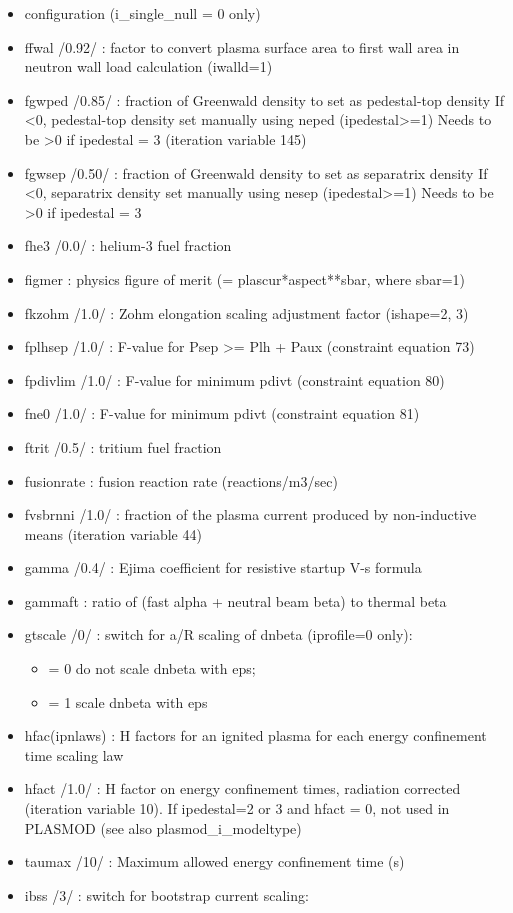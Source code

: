 \documentclass[]{article}
\providecommand{\tightlist}{%
  \setlength{\itemsep}{0pt}\setlength{\parskip}{0pt}}
\begin{document}
\begin{itemize}
\item
  configuration (i_single_null = 0 only)
\item
  ffwal /0.92/ : factor to convert plasma surface area to first wall
  area in neutron wall load calculation (iwalld=1)
\item
  fgwped /0.85/ : fraction of Greenwald density to set as pedestal-top
  density If \textless{}0, pedestal-top density set manually using neped
  (ipedestal\textgreater{}=1) Needs to be \textgreater{}0 if ipedestal =
  3 (iteration variable 145)
\item
  fgwsep /0.50/ : fraction of Greenwald density to set as separatrix
  density If \textless{}0, separatrix density set manually using nesep
  (ipedestal\textgreater{}=1) Needs to be \textgreater{}0 if ipedestal =
  3
\item
  fhe3 /0.0/ : helium-3 fuel fraction
\item
  figmer : physics figure of merit (= plascur*aspect**sbar, where
  sbar=1)
\item
  fkzohm /1.0/ : Zohm elongation scaling adjustment factor (ishape=2, 3)
\item
  fplhsep /1.0/ : F-value for Psep \textgreater{}= Plh + Paux
  (constraint equation 73)
\item
  fpdivlim /1.0/ : F-value for minimum pdivt (constraint equation 80)
\item
  fne0 /1.0/ : F-value for minimum pdivt (constraint equation 81)
\item
  ftrit /0.5/ : tritium fuel fraction
\item
  fusionrate : fusion reaction rate (reactions/m3/sec)
\item
  fvsbrnni /1.0/ : fraction of the plasma current produced by
  non-inductive means (iteration variable 44)
\item
  gamma /0.4/ : Ejima coefficient for resistive startup V-s formula
\item
  gammaft : ratio of (fast alpha + neutral beam beta) to thermal beta
\item
  gtscale /0/ : switch for a/R scaling of dnbeta (iprofile=0 only):

  \begin{itemize}
  \tightlist
  \item
    = 0 do not scale dnbeta with eps;
  \item
    = 1 scale dnbeta with eps
  \end{itemize}
\item
  hfac(ipnlaws) : H factors for an ignited plasma for each energy
  confinement time scaling law
\item
  hfact /1.0/ : H factor on energy confinement times, radiation
  corrected (iteration variable 10). If ipedestal=2 or 3 and hfact = 0,
  not used in PLASMOD (see also plasmod\_i\_modeltype)
\item
  taumax /10/ : Maximum allowed energy confinement time (s)
\item
  ibss /3/ : switch for bootstrap current scaling:


\end{itemize}
\end{document}
